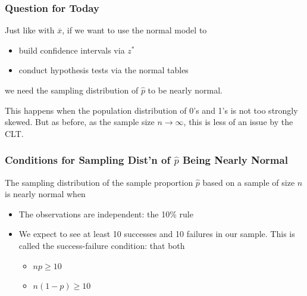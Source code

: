 \documentclass[slides]{beamer}
\newcommand{\blue}[1]{\textcolor{blue2}{#1}}
\newcommand{\xbar}{\overline{x}}
\newcommand{\phat}{\widehat{p}}
\begin{document}
\begin{frame}[fragile]
\frametitle{Question for Today}

Just like with $\xbar$, if we want to use the normal model to
\begin{itemize}
\item build confidence intervals via $z^*$
\item conduct hypothesis tests via the normal tables
\end{itemize}
we need the \blue{sampling distribution} of $\phat$ to be nearly normal.  

\vspace{0.5cm}
\pause This happens when the population distribution of 0's and 1's is not too strongly skewed.  But as before, as the sample size $n \longrightarrow \infty$, this is less of an issue by the CLT. 

\end{frame}


\begin{frame}[fragile]
\frametitle{Conditions for Sampling Dist'n of $\phat$ Being Nearly Normal}

The sampling distribution of the \blue{sample proportion} $\phat$ based on a sample of size $n$ is nearly normal when

\begin{itemize}
\pause \item The observations are independent:  the 10\% rule
\pause \item We expect to see at least 10 successes and 10 failures in our sample.  This is called the \blue{success-failure condition}: that both
\begin{itemize}
\item $np \geq 10$
\item $n(1-p) \geq 10$ 
\end{itemize}
\end{itemize}
\end{frame}
\end{document}
